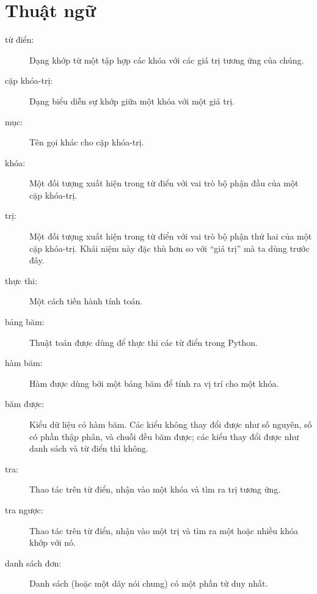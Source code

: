 \documentclass[11pt]{book}
\begin{document}

\section{Thuật ngữ}

\begin{description}

\item[từ điển:] Dạng khớp từ một tập hợp các khóa với các giá trị 
tương ứng của chúng.

\item[cặp khóa-trị:] Dạng biểu diễn sự khớp giữa một khóa với
một giá trị.

\item[mục:] Tên gọi khác cho cặp khóa-trị.

\item[khóa:] Một đối tượng xuất hiện trong từ điển với vai trò
bộ phận đầu của một cặp khóa-trị.

\item[trị:] Một đối tượng xuất hiện trong từ điển với vai trò
bộ phận thứ hai của một cặp khóa-trị. Khái niệm này đặc thù hơn
so với ``giá trị'' mà ta dùng trước đây.

\item[thực thi:] Một cách tiến hành tính toán.

\item[bảng băm:] Thuật toán được dùng để thực thi các từ điển
trong Python.

\item[hàm băm:] Hàm được dùng bởi một bảng băm để tính ra
vị trí cho một khóa.

\item[băm được:] Kiểu dữ liệu có hàm băm. Các kiểu
không thay đổi được như số nguyên, số có phần thập phân, và
chuỗi đều băm được; các kiểu thay đổi được như danh sách và
từ điển thì không.

\item[tra:] Thao tác trên từ điển, nhận vào một khóa và
tìm ra trị tương ứng.

\item[tra ngược:] Thao tác trên từ điển, nhận vào một trị và
tìm ra một hoặc nhiều khóa khớp với nó.

\item[danh sách đơn:] Danh sách (hoặc một dãy nói chung) có một 
phần tử duy nhất.


\end{description}
\end{document}
